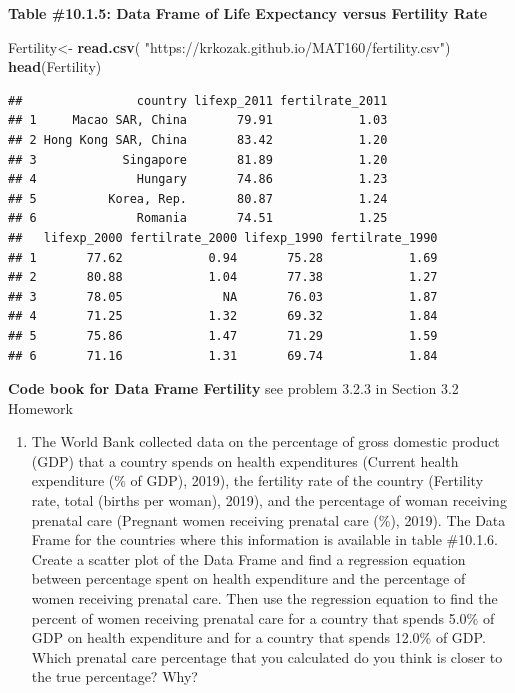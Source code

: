 \documentclass[
]{book}
\newenvironment{Shaded}{\begin{snugshade}}{\end{snugshade}}
\newcommand{\KeywordTok}[1]{\textcolor[rgb]{0.13,0.29,0.53}{\textbf{#1}}}
\newcommand{\NormalTok}[1]{#1}
\newcommand{\StringTok}[1]{\textcolor[rgb]{0.31,0.60,0.02}{#1}}
\providecommand{\tightlist}{%
  \setlength{\itemsep}{0pt}\setlength{\parskip}{0pt}}
\begin{document}
\textbf{Table \#10.1.5: Data Frame of Life Expectancy versus Fertility Rate}

\begin{Shaded}
\begin{Highlighting}[]
\NormalTok{Fertility<-}\StringTok{ }\KeywordTok{read.csv}\NormalTok{(}
  \StringTok{"https://krkozak.github.io/MAT160/fertility.csv"}\NormalTok{)}
\KeywordTok{head}\NormalTok{(Fertility)}
\end{Highlighting}
\end{Shaded}

\begin{verbatim}
##                country lifexp_2011 fertilrate_2011
## 1     Macao SAR, China       79.91            1.03
## 2 Hong Kong SAR, China       83.42            1.20
## 3            Singapore       81.89            1.20
## 4              Hungary       74.86            1.23
## 5          Korea, Rep.       80.87            1.24
## 6              Romania       74.51            1.25
##   lifexp_2000 fertilrate_2000 lifexp_1990 fertilrate_1990
## 1       77.62            0.94       75.28            1.69
## 2       80.88            1.04       77.38            1.27
## 3       78.05              NA       76.03            1.87
## 4       71.25            1.32       69.32            1.84
## 5       75.86            1.47       71.29            1.59
## 6       71.16            1.31       69.74            1.84
\end{verbatim}

\textbf{Code book for Data Frame Fertility} see problem 3.2.3 in Section 3.2 Homework

\begin{enumerate}
\def\labelenumi{\arabic{enumi}.}
\setcounter{enumi}{3}
\tightlist
\item
  The World Bank collected data on the percentage of gross domestic product (GDP) that a country spends on health expenditures (Current health expenditure (\% of GDP), 2019), the fertility rate of the country (Fertility rate, total (births per woman), 2019), and the percentage of woman receiving prenatal care (Pregnant women receiving prenatal care (\%), 2019). The Data Frame for the countries where this information is available in table \#10.1.6. Create a scatter plot of the Data Frame and find a regression equation between percentage spent on health expenditure and the percentage of women receiving prenatal care. Then use the regression equation to find the percent of women receiving prenatal care for a country that spends 5.0\% of GDP on health expenditure and for a country that spends 12.0\% of GDP. Which prenatal care percentage that you calculated do you think is closer to the true percentage? Why?
\end{enumerate}
\end{document}
